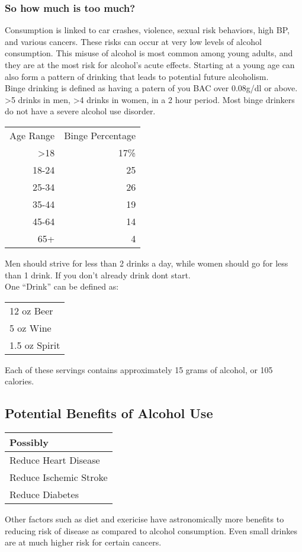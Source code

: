 \documentclass[letterpaper, 11pt]{article}
\begin{document}
\subsubsection{So how much is too much?}
\label{sec:org08534f4}
Consumption is linked to car crashes, violence, sexual risk behaviors, high BP, and various cancers. These risks can occur at very low levels of alcohol consumption. This misuse of alcohol is most common among young adults, and they are at the most risk for alcohol's acute effects. Starting at a young age can also form a pattern of drinking that leads to potential future alcoholism.\\
Binge drinking is defined as having a patern of you BAC over 0.08g/dl or above. >5 drinks in men, >4 drinks in women, in a 2 hour period. Most binge drinkers do not have a severe alcohol use disorder.\\
\begin{center}
\begin{tabular}{rr}
Age Range & Binge Percentage\\
>18 & 17\%\\
18-24 & 25\\
25-34 & 26\\
35-44 & 19\\
45-64 & 14\\
65+ & 4\\
\end{tabular}
\end{center}
Men should strive for less than 2 drinks a day, while women should go for less than 1 drink. If you don't already drink dont start.\\
One ``Drink'' can be defined as:\\
\begin{center}
\begin{tabular}{l}
12 oz Beer\\
5 oz Wine\\
1.5 oz Spirit\\
\end{tabular}
\end{center}
Each of these servings contains approximately 15 grams of alcohol, or 105 calories.\\
\subsection{Potential Benefits of Alcohol Use}
\label{sec:org560bda9}
\begin{center}
\begin{tabular}{l}
Possibly\\
\hline
Reduce Heart Disease\\
Reduce Ischemic Stroke\\
Reduce Diabetes\\
\end{tabular}
\end{center}
Other factors such as diet and exericise have astronomically more benefits to reducing risk of disease as compared to alcohol consumption. Even small drinkes are at much higher risk for certain cancers.\\
\end{document}
